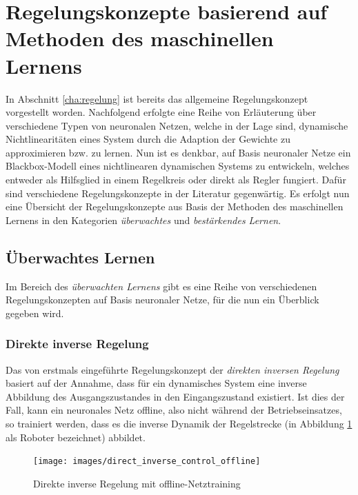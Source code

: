 \section{Regelungskonzepte basierend auf Methoden des maschinellen Lernens}

In Abschnitt \ref{cha:regelung} ist bereits das allgemeine Regelungskonzept vorgestellt worden. Nachfolgend erfolgte eine Reihe von Erläuterung über verschiedene Typen von neuronalen Netzen, welche in der Lage sind, dynamische Nichtlinearitäten eines System durch die Adaption der Gewichte zu approximieren bzw. zu lernen. Nun ist es denkbar, auf Basis neuronaler Netze ein Blackbox-Modell eines nichtlinearen dynamischen Systems zu entwickeln, welches entweder als Hilfsglied in einem Regelkreis oder direkt als Regler fungiert. Dafür sind verschiedene Regelungskonzepte in der Literatur gegenwärtig. Es erfolgt nun eine Übersicht der Regelungskonzepte aus Basis der Methoden des maschinellen Lernens in den Kategorien \textit{überwachtes} und \textit{bestärkendes Lernen}.\\


\subsection{Überwachtes Lernen} 

Im Bereich des \textit{überwachten Lernens} gibt es eine Reihe von verschiedenen Regelungskonzepten auf Basis neuronaler Netze, für die nun ein Überblick gegeben wird.


\subsubsection{Direkte inverse Regelung}
\label{cha:direct_inverse}
Das von \cite{Werbos.2014} erstmals eingeführte Regelungskonzept der \textit{direkten inversen Regelung} basiert auf der Annahme, dass für ein dynamisches System eine inverse Abbildung des Ausgangszustandes in den Eingangszustand existiert.  Ist dies der Fall, kann ein neuronales Netz offline, also nicht während der Betriebseinsatzes, so trainiert werden, dass es die inverse Dynamik der Regelstrecke (in Abbildung \ref{fig:direct_inverse_offline} als Roboter bezeichnet) abbildet. \\ 

\begin{figure} [h]
	\centering
	\texttt{[image: images/direct\_inverse\_control\_offline]}
	\caption{Direkte inverse Regelung mit offline-Netztraining \cite{Sklyarenko.2002}}
	\label{fig:direct_inverse_offline}
\end{figure}

